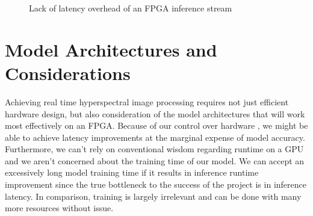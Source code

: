 \documentclass[psamsfonts]{amsart}
\newcommand{\mycomment}[1]{}
\theoremstyle{definition}
\theoremstyle{remark}
\numberwithin{equation}{section}
\begin{document}
\begin{figure}[ht]
  \centering
  \caption{Lack of latency overhead of an FPGA inference stream}
  \label{fig:fpgadiagram}
\end{figure}

\section{Model Architectures and Considerations}
Achieving real time hyperspectral image processing requires not just efficient hardware design, but also consideration of the model architectures that will work most effectively on an FPGA. Because of our control over hardware
\mycomment{Note: not sure what I wanted to say here and usage of pipelining and fixed data types},
we might be able to achieve latency improvements at the marginal expense of model accuracy. Furthermore, we can't rely on conventional wisdom regarding runtime on a GPU and we aren't concerned about the training time of our model. We can accept an excessively long model training time if it results in inference runtime improvement since the true bottleneck to the success of the project is in inference latency. In comparison, training is largely irrelevant and can be done with many more resources without issue.
\end{document}
